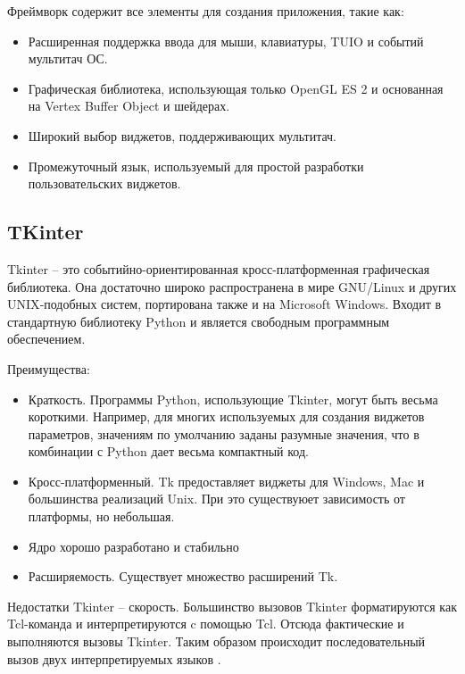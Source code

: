 \documentclass[14pt]{extreport}
\begin{document}
Фреймворк содержит все элементы для создания приложения, такие как:
\begin{itemize}
\item Расширенная поддержка ввода для мыши, клавиатуры, TUIO и событий мультитач ОС.
\item Графическая библиотека, использующая только OpenGL ES 2 и основанная на Vertex Buffer Object и шейдерах.
\item Широкий выбор виджетов, поддерживающих мультитач.
\item Промежуточный язык, используемый для простой разработки пользовательских виджетов.
\end{itemize}

\subsection{TKinter}

Tkinter -- это событийно-ориентированная кросс-платформенная графическая библиотека. Она достаточно широко распространена в мире GNU/Linux и других UNIX‐подобных систем, портирована также и на Microsoft Windows. Входит в стандартную библиотеку Python и является свободным программным обеспечением.

Преимущества:
\begin{itemize}
	\item	 Краткость. Программы Python, использующие Tkinter, могут быть весьма короткими. Например, для многих используемых для создания виджетов параметров, значениям по умолчанию заданы разумные значения, что в комбинации с Python дает весьма компактный код.
	
	\item Кросс-платформенный. Tk предоставляет виджеты для Windows, Mac и большинства реализаций Unix. При это существуюет зависимость от платформы, но небольшая.
	
	\item Ядро хорошо разработано и стабильно
	
	\item Расширяемость. Существует множество расширений Tk.

\end{itemize}

Недостатки Tkinter -- скорость. Большинство вызовов Tkinter форматируются как Tcl-команда и интерпретируются c помощью Tcl. Отсюда фактические и выполняются вызовы Tkinter. Таким образом происходит последовательный вызов двух интерпретируемых языков \cite{pythonRob}.
\end{document}
